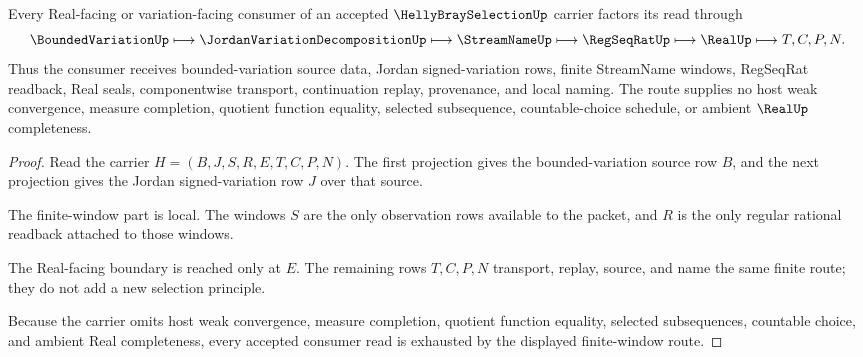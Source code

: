 \begin{theorem}
\label{thm:helly-bray-selection-finite-window-route}
Every Real-facing or variation-facing consumer of an accepted $\HellyBraySelectionUp$ carrier factors its read through
$$
\BoundedVariationUp \longmapsto \JordanVariationDecompositionUp \longmapsto \StreamNameUp \longmapsto \RegSeqRatUp \longmapsto \RealUp \longmapsto T,C,P,N .
$$
Thus the consumer receives bounded-variation source data, Jordan signed-variation rows, finite StreamName windows, RegSeqRat readback, Real seals, componentwise transport, continuation replay, provenance, and local naming. The route supplies no host weak convergence, measure completion, quotient function equality, selected subsequence, countable-choice schedule, or ambient $\RealUp$ completeness.
\end{theorem}
\begin{proof}
Read the carrier $H=(B,J,S,R,E,T,C,P,N)$. The first projection gives the bounded-variation source row $B$, and the next projection gives the Jordan signed-variation row $J$ over that source.

The finite-window part is local. The windows $S$ are the only observation rows available to the packet, and $R$ is the only regular rational readback attached to those windows.

The Real-facing boundary is reached only at $E$. The remaining rows $T,C,P,N$ transport, replay, source, and name the same finite route; they do not add a new selection principle.

Because the carrier omits host weak convergence, measure completion, quotient function equality, selected subsequences, countable choice, and ambient Real completeness, every accepted consumer read is exhausted by the displayed finite-window route.
\end{proof}

